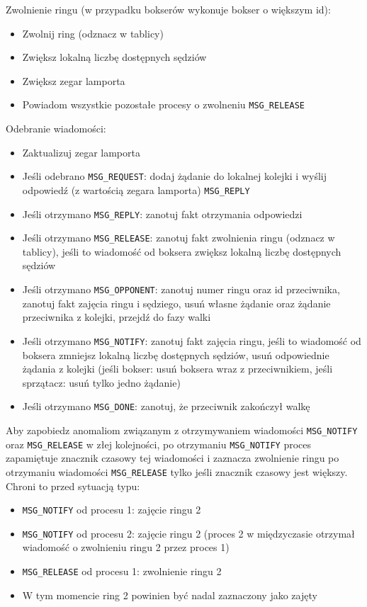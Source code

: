 \documentclass{article}
\begin{document}
Zwolnienie ringu (w przypadku bokserów wykonuje bokser o większym id):
\begin{itemize}
    \item Zwolnij ring (odznacz w tablicy)
    \item Zwiększ lokalną liczbę dostępnych sędziów
    \item Zwiększ zegar lamporta
    \item Powiadom wszystkie pozostałe procesy o zwolneniu \verb|MSG_RELEASE|
\end{itemize}

Odebranie wiadomości:
\begin{itemize}
    \item Zaktualizuj zegar lamporta
    \item Jeśli odebrano \verb|MSG_REQUEST|: dodaj żądanie do lokalnej
    kolejki i  wyślij odpowiedź (z wartością zegara lamporta) \verb|MSG_REPLY|
    \item Jeśli otrzymano \verb|MSG_REPLY|: zanotuj fakt otrzymania
    odpowiedzi
    \item Jeśli otrzymano \verb|MSG_RELEASE|: zanotuj fakt zwolnienia
    ringu (odznacz w tablicy), jeśli to wiadomość od boksera zwiększ
    lokalną liczbę dostępnych sędziów
    \item Jeśli otrzymano \verb|MSG_OPPONENT|: zanotuj numer ringu oraz
    id przeciwnika, zanotuj fakt zajęcia ringu i sędziego, usuń własne
    żądanie oraz żądanie przeciwnika z kolejki, przejdź do fazy walki
    \item Jeśli otrzymano \verb|MSG_NOTIFY|: zanotuj fakt zajęcia ringu,
    jeśli to wiadomość od boksera zmniejsz lokalną liczbę dostępnych
    sędziów, usuń odpowiednie żądania z kolejki (jeśli bokser: usuń
    boksera wraz z przeciwnikiem, jeśli sprzątacz: usuń tylko jedno
    żądanie)
    \item Jeśli otrzymano \verb|MSG_DONE|: zanotuj, że przeciwnik
    zakończył walkę
\end{itemize}

Aby zapobiedz anomaliom związanym z otrzymywaniem wiadomości
\verb|MSG_NOTIFY| oraz \verb|MSG_RELEASE| w złej kolejności, po
otrzymaniu \verb|MSG_NOTIFY| proces zapamiętuje znacznik czasowy tej
wiadomości i zaznacza zwolnienie ringu po otrzymaniu wiadomości \verb|MSG_RELEASE|
tylko jeśli znacznik czasowy jest większy. Chroni to przed sytuacją
typu:
\begin{itemize}
    \item \verb|MSG_NOTIFY| od procesu 1: zajęcie ringu 2
    \item \verb|MSG_NOTIFY| od procesu 2: zajęcie ringu 2 (proces 2 w
    międzyczasie otrzymał wiadomość o zwolnieniu ringu 2 przez proces 1)
    \item \verb|MSG_RELEASE| od procesu 1: zwolnienie ringu 2
    \item W tym momencie ring 2 powinien być nadal zaznaczony jako
    zajęty
\end{itemize}
\end{document}
